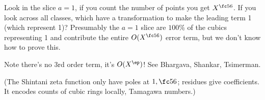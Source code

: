 Look in the slice $a=1$, if you count the number of points you get $X^{\fc 56}$. If you look across all classes, which have a transformation to make the leading term 1 (which represent 1)? Presumably the $a=1$ slice are $100\%$ of the cubics representing 1 and contribute the entire $O(X^{\fc 56})$ error term, but we don't know how to prove this.

Note there's no 3rd order term, it's $O(X^\ep)$! See Bhargava, Shankar, Tsimerman.

(The Shintani zeta function only have poles at $1, \fc 56$; residues give coefficients. It encodes counts of cubic rings locally, Tamagawa numbers.)